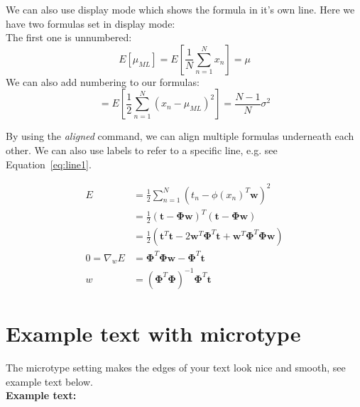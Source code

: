 \documentclass[10pt,parskip=half]{scrartcl}
\begin{document}
We can also use display mode which shows the formula in it's own line. Here we have two formulas set in display mode: \\ 

The first one is unnumbered: 
\[E[\mu_{ML}] = E[\frac{1}{N}\sum_{n=1}^{N}x_n] = \mu\]
We can also add numbering to our formulas: 
\begin{equation}[\sigma^2_{ML}] = E[\frac{1}{2}\sum_{n=1}^{N}(x_n - \mu_{ML})^2] = \frac{N-1}{N} \sigma^2\end{equation}


By using the \emph{aligned} command, we can align multiple formulas underneath each other. We can also use labels to refer to a specific line, e.g. see Equation~\ref{eq:line1}. 

\begin{align}
	E &= \frac{1}{2} \sum_{n=1}^{N}(t_n - \phi(x_n)^T \textbf{w})^2 \label{eq:line1} \\
	&= \frac{1}{2}(\mathbf{t} - \mathbf{\Phi w})^T(\mathbf{t} - \mathbf{\Phi w}) \\
	&= \frac{1}{2} (\mathbf{t}^T\mathbf{t} - 2\mathbf{w}^T\mathbf{\Phi}^T\mathbf{t} + \mathbf{w}^T\mathbf{\Phi}^T\mathbf{\Phi w}) \\
	0 = \nabla_wE &= \mathbf{\Phi}^T\mathbf{\Phi w} - \mathbf{\Phi}^T \mathbf{t} \\
	w &= (\mathbf{\Phi}^T\mathbf{\Phi})^{-1}\mathbf{\Phi}^T \mathbf{t}
\end{align}


\section{Example text with microtype}

The microtype setting makes the edges of your text look nice and smooth, see example text below. \\

\textbf{Example text:}

\lipsum[2-4]
\end{document}
